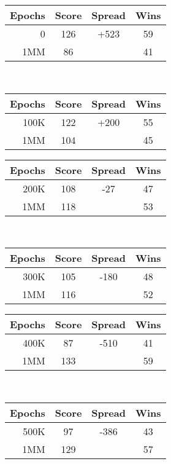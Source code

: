 
\begin{table}
\center

\begin{tabular}{|r|c|c|c|}
	\hline
	\textbf{Epochs} & \textbf{Score} & \textbf{Spread} & \textbf{Wins}
	\\\hline
	0 & 126 & +523 & 59
	\\\hline
	1MM & 86 & \textemdash & 41
	\\\hline
\end{tabular}
~
\begin{tabular}{|r|c|c|c|}
	\hline
	\textbf{Epochs} & \textbf{Score} & \textbf{Spread} & \textbf{Wins}
	\\\hline
	100K & 122 & +200 & 55
	\\\hline
	1MM & 104 & \textemdash & 45
	\\\hline
\end{tabular}

\begin{tabular}{|r|c|c|c|}
	\hline
	\textbf{Epochs} & \textbf{Score} & \textbf{Spread} & \textbf{Wins}
	\\\hline
	200K & 108 & -27 & 47
	\\\hline
	1MM & 118 & \textemdash & 53
	\\\hline
\end{tabular}
~
\begin{tabular}{|r|c|c|c|}
	\hline
	\textbf{Epochs} & \textbf{Score} & \textbf{Spread} & \textbf{Wins}
	\\\hline
	300K & 105 & -180 & 48
	\\\hline
	1MM & 116 & \textemdash & 52
	\\\hline
\end{tabular}

\begin{tabular}{|r|c|c|c|}
	\hline
	\textbf{Epochs} & \textbf{Score} & \textbf{Spread} & \textbf{Wins}
	\\\hline
	400K & 87 & -510 & 41
	\\\hline
	1MM & 133 & \textemdash & 59
	\\\hline
\end{tabular}
~
\begin{tabular}{|r|c|c|c|}
	\hline
	\textbf{Epochs} & \textbf{Score} & \textbf{Spread} & \textbf{Wins}
	\\\hline
	500K & 97 & -386 & 43
	\\\hline
	1MM & 129 & \textemdash & 57
	\\\hline
\end{tabular}


\end{table}
